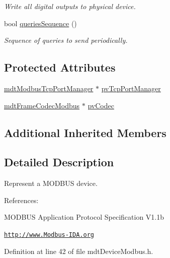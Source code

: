 \begin{DoxyCompactItemize}
\begin{DoxyCompactList}\small\item\em Write all digital outputs to physical device. \end{DoxyCompactList}\item 
bool \hyperlink{classmdt_device_modbus_a3b83b926ed1f9c3bdf7024de2745c285}{queries\-Sequence} ()
\begin{DoxyCompactList}\small\item\em Sequence of queries to send periodically. \end{DoxyCompactList}\end{DoxyCompactItemize}
\subsection*{Protected Attributes}
\begin{DoxyCompactItemize}
\item 
\hyperlink{classmdt_modbus_tcp_port_manager}{mdt\-Modbus\-Tcp\-Port\-Manager} $\ast$ \hyperlink{classmdt_device_modbus_a9ecbac63c29b229ab01f5fdb26008c95}{pv\-Tcp\-Port\-Manager}
\item 
\hyperlink{classmdt_frame_codec_modbus}{mdt\-Frame\-Codec\-Modbus} $\ast$ \hyperlink{classmdt_device_modbus_a2171d37ea720d546934f1c841e3c4d26}{pv\-Codec}
\end{DoxyCompactItemize}
\subsection*{Additional Inherited Members}


\subsection{Detailed Description}
Represent a M\-O\-D\-B\-U\-S device. 

References\-:
\begin{DoxyItemize}
\item M\-O\-D\-B\-U\-S Application Protocol Specification V1.\-1b
\item \href{http://www.Modbus-IDA.org}{\tt http\-://www.\-Modbus-\/\-I\-D\-A.\-org} 
\end{DoxyItemize}

Definition at line 42 of file mdt\-Device\-Modbus.\-h.



